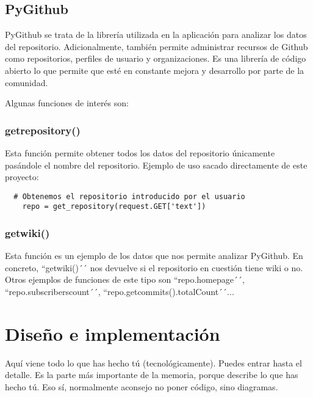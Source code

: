 \documentclass[a4paper, 12pt]{book}
\begin{document}
\section{PyGithub}
\label{sec:pygithub}

PyGithub\cite{website:Pygithub} se trata de la librería utilizada en la aplicación para analizar los datos del repositorio. Adicionalmente, también permite administrar recursos de Github como repositorios, perfiles de usuario y organizaciones. Es una librería de código abierto lo que permite que esté en constante mejora y desarrollo por parte de la comunidad. 

Algunas funciones de interés son:

\subsection{getrepository()}

Esta función permite obtener todos los datos del repositorio únicamente pasándole el nombre del repositorio. Ejemplo de uso sacado directamente de este proyecto:

 {\footnotesize
\begin{verbatim}
  # Obtenemos el repositorio introducido por el usuario
    repo = get_repository(request.GET['text'])
\end{verbatim}
}

\subsection{getwiki()}

Esta función es un ejemplo de los datos que nos permite analizar PyGithub. En concreto, ``getwiki()´´ nos devuelve si el repositorio en cuestión tiene wiki o no. Otros ejemplos de funciones de este tipo son ``repo.homepage´´, ``repo.subscriberscount´´, ``repo.getcommits().totalCount´´...


\cleardoublepage
\chapter{Diseño e implementación}

Aquí viene todo lo que has hecho tú (tecnológicamente). 
Puedes entrar hasta el detalle. 
Es la parte más importante de la memoria, porque describe lo que has hecho tú.
Eso sí, normalmente aconsejo no poner código, sino diagramas.
\end{document}
